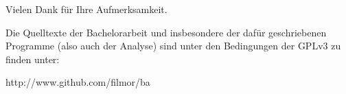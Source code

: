 \documentclass{beamer}
\begin{document}
\begin{frame}{}
  \begin{center}\Large Vielen Dank für Ihre Aufmerksamkeit.\end{center}
  \vskip10pt

  Die Quelltexte der Bachelorarbeit und insbesondere der dafür geschriebenen
  Programme (also auch der Analyse) sind unter den Bedingungen der GPLv3 zu finden
  unter:
  \vskip10pt

  \begin{center}http://www.github.com/filmor/ba\end{center}
\end{frame}
\end{document}
